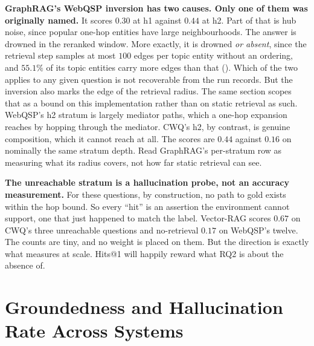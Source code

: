 \textbf{GraphRAG's WebQSP inversion has two causes. Only one of them was
originally named.} It scores $0.30$ at \textsf{h1} against $0.44$ at
\textsf{h2}. Part of that is hub noise, since popular one-hop entities have
large neighbourhoods. The answer is drowned in the reranked window. More
exactly, it is drowned \emph{or absent}, since the retrieval step samples at
most $100$ edges per topic entity without an ordering, and $55.1\%$ of its topic
entities carry more edges than that (). Which of the
two applies to any given question is not recoverable from the run records. But
the inversion also marks the edge of the retrieval radius. The same section
scopes that as a bound on this implementation rather than on static retrieval as
such. WebQSP's \textsf{h2} stratum is largely mediator paths, which a one-hop
expansion reaches by hopping through the mediator. CWQ's \textsf{h2}, by
contrast, is genuine composition, which it cannot reach at all. The scores are
$0.44$ against $0.16$ on nominally the same stratum depth. Read GraphRAG's
per-stratum row as measuring what its radius covers, not how far static
retrieval can see.

\textbf{The unreachable stratum is a hallucination probe, not an accuracy
measurement.} For these questions, by construction, no path to gold exists
within the hop bound. So every ``hit'' is an assertion the environment cannot
support, one that just happened to match the label. Vector-RAG scores $0.67$ on
CWQ's three unreachable questions and no-retrieval $0.17$ on WebQSP's twelve.
The counts are tiny, and no weight is placed on them. But the direction is
exactly what  measures at scale. Hits@1 will
happily reward what RQ2 is about the absence of.

\section{Groundedness and Hallucination Rate Across
Systems}\label{sec:groundedness-results}

